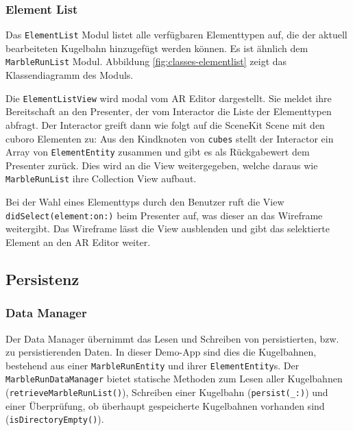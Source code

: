 \subsubsection{Element List} \label{subsub:umsetzung-modul-elementlist}

Das \texttt{ElementList} Modul listet alle verfügbaren Elementtypen auf, die der aktuell bearbeiteten Kugelbahn hinzugefügt werden können.
Es ist ähnlich dem \texttt{MarbleRunList} Modul.
Abbildung \ref{fig:classes-elementlist} zeigt das Klassendiagramm des Moduls.


Die \texttt{ElementListView} wird modal vom AR Editor dargestellt.
Sie meldet ihre Bereitschaft an den Presenter, der vom Interactor die Liste der Elementtypen abfragt.
Der Interactor greift dann wie folgt auf die SceneKit Scene mit den cuboro Elementen zu:
Aus den Kindknoten von \texttt{cubes} stellt der Interactor ein Array von \texttt{ElementEntity} zusammen und gibt es als Rückgabewert dem Presenter zurück.
Dies wird an die View weitergegeben, welche daraus wie \texttt{MarbleRunList} ihre Collection View aufbaut.

Bei der Wahl eines Elementtyps durch den Benutzer ruft die View \texttt{didSelect(element:on:)} beim Presenter auf, was dieser an das Wireframe weitergibt.
Das Wireframe lässt die View ausblenden und gibt das selektierte Element an den AR Editor weiter.

\subsection{Persistenz}

\subsubsection{Data Manager} \label{subsub:umsetzung-datamanager}

Der Data Manager übernimmt das Lesen und Schreiben von persistierten, bzw. zu persistierenden Daten.
In dieser Demo-App sind dies die Kugelbahnen, bestehend aus einer \texttt{MarbleRunEntity} und ihrer \texttt{ElementEntity}s.
Der \texttt{MarbleRunDataManager} bietet statische Methoden zum Lesen aller Kugelbahnen (\texttt{retrieveMarbleRunList()}), Schreiben einer Kugelbahn (\texttt{persist(\_:)}) und einer Überprüfung, ob überhaupt gespeicherte Kugelbahnen vorhanden sind (\texttt{isDirectoryEmpty()}).

